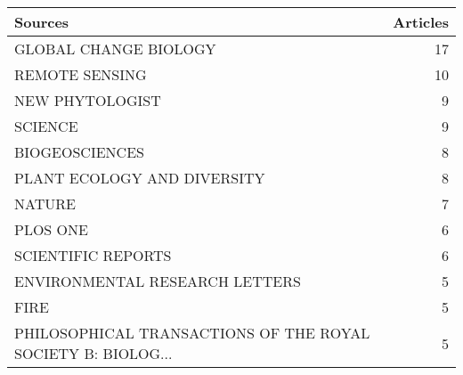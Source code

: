 
\begin{tabular}{lr}
\toprule
Sources & Articles\\
\midrule
GLOBAL CHANGE BIOLOGY & 17\\
REMOTE SENSING & 10\\
NEW PHYTOLOGIST & 9\\
SCIENCE & 9\\
BIOGEOSCIENCES & 8\\
\addlinespace
PLANT ECOLOGY AND DIVERSITY & 8\\
NATURE & 7\\
PLOS ONE & 6\\
SCIENTIFIC REPORTS & 6\\
ENVIRONMENTAL RESEARCH LETTERS & 5\\
\addlinespace
FIRE & 5\\
PHILOSOPHICAL TRANSACTIONS OF THE ROYAL SOCIETY B: BIOLOG... & 5\\
\bottomrule
\end{tabular}